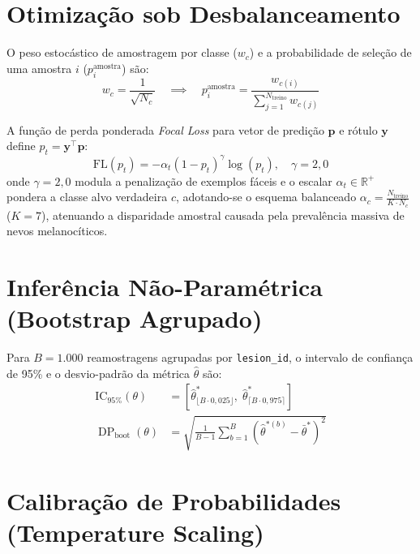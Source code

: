 \documentclass[oneside,english,brazilian]{UNISINOSmonografia}
\begin{document}
\section{Otimização sob Desbalanceamento}
\label{sec:apendice_desbalanceamento}

O peso estocástico de amostragem por classe ($w_c$) e a probabilidade de seleção de uma amostra $i$ ($p_i^{\text{amostra}}$) são:
\begin{equation}
    \label{eq:apendice_weighted_sampler}
    w_c = \frac{1}{\sqrt{N_c}} \quad \implies \quad p_i^{\text{amostra}} = \frac{w_{c(i)}}{\sum_{j=1}^{N_{\text{treino}}} w_{c(j)}}
\end{equation}

A função de perda ponderada \textit{Focal Loss} \cite{lin2017focal} para vetor de predição $\mathbf{p}$ e rótulo $\mathbf{y}$ define $p_t = \mathbf{y}^\top \mathbf{p}$:
\begin{equation}
    \label{eq:apendice_focal_loss}
    \text{FL}(p_t) = -\alpha_t (1 - p_t)^\gamma \log(p_t), \quad \gamma = 2{,}0
\end{equation}
onde $\gamma = 2{,}0$ modula a penalização de exemplos fáceis e o escalar $\alpha_t \in \mathbb{R}^+$ pondera a classe alvo verdadeira $c$, adotando-se o esquema balanceado $\alpha_c = \frac{N_{\text{treino}}}{K \cdot N_c}$ ($K=7$), atenuando a disparidade amostral causada pela prevalência massiva de nevos melanocíticos.

\section{Inferência Não-Paramétrica (Bootstrap Agrupado)}
\label{sec:apendice_bootstrap}

Para $B=1.000$ reamostragens agrupadas por \texttt{lesion\_id}, o intervalo de confiança de 95\% e o desvio-padrão da métrica $\hat{\theta}$ são:
\begin{align}
    \text{IC}_{95\%}(\theta) &= \left[ \hat{\theta}^*_{\lfloor B \cdot 0{,}025 \rfloor}, \; \hat{\theta}^*_{\lceil B \cdot 0{,}975 \rceil} \right] \label{eq:apendice_bootstrap_interval} \\
    \operatorname{DP}_{\text{boot}}(\theta) &= \sqrt{\frac{1}{B - 1} \sum_{b=1}^B \left( \hat{\theta}^{*(b)} - \bar{\theta}^* \right)^2} \label{eq:apendice_bootstrap_std}
\end{align}

\section{Calibração de Probabilidades (Temperature Scaling)}
\label{sec:apendice_calibracao}
\end{document}
